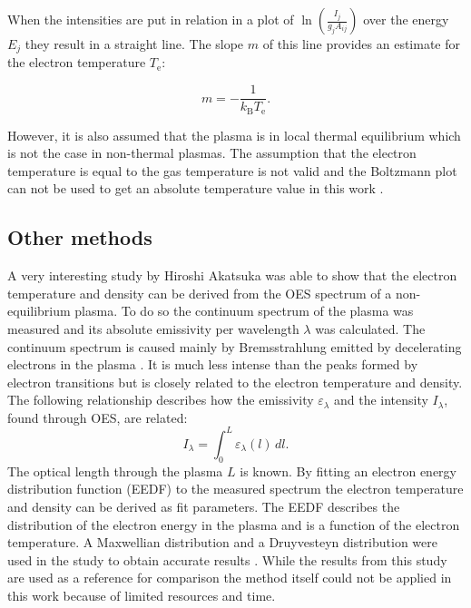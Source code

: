 When the intensities are put in relation in a plot of $ \ln \left( \frac{I_j}{g_j A_{ij}} \right) $ over the energy $ E_j $ they result in a straight line. The slope $ m $ of this line provides an estimate for the electron temperature $ T_\text{e} $:

\begin{equation}
    m = - \frac{1}{k_\text{B} T_\text{e}}.
\end{equation}

However, it is also assumed that the plasma is in local thermal equilibrium which is not the case in non-thermal plasmas. The assumption that the electron temperature is equal to the gas temperature is not valid and the Boltzmann plot can not be used to get an absolute temperature value in this work \cite{plasma2}. 

\subsection{Other methods}
\label{sec:oes_temperature}
A very interesting study by Hiroshi Akatsuka \cite{oes_temperature} was able to show that the electron temperature and density can be derived from the OES spectrum of a non-equilibrium plasma. To do so the continuum spectrum of the plasma was measured and its absolute emissivity per wavelength $\lambda$ was calculated. The continuum spectrum is caused mainly by Bremsstrahlung emitted by decelerating electrons in the plasma \cite{oes_temperature}. It is much less intense than the peaks formed by electron transitions but is closely related to the electron temperature and density. The following relationship describes how the emissivity $\varepsilon_\lambda$ and the intensity $I_\lambda$, found through OES, are related:
\begin{equation}
I_\lambda = \int_0^L \varepsilon_\lambda(l) \, dl.
\end{equation}
The optical length through the plasma $L$ is known. By fitting an electron energy distribution function (EEDF) to the measured spectrum the electron temperature and density can be derived as fit parameters. The EEDF describes the distribution of the electron energy in the plasma and is a function of the electron temperature. A Maxwellian distribution and a Druyvesteyn distribution were used in the study to obtain accurate results \cite{oes_temperature}. While the results from this study are used as a reference for comparison the method itself could not be applied in this work because of limited resources and time.  

